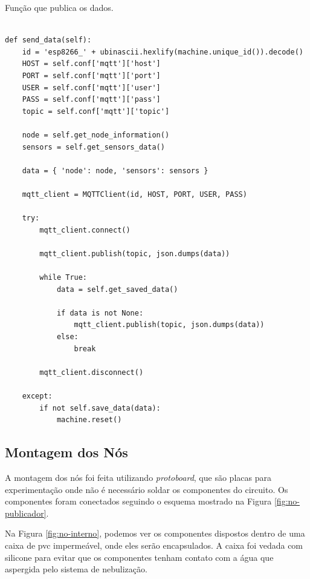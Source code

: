 \begin{quadro}[H]
\centering
\caption{Função que publica os dados.}
\vspace{-\baselineskip}
\begin{verbatim}

def send_data(self):
    id = 'esp8266_' + ubinascii.hexlify(machine.unique_id()).decode()
    HOST = self.conf['mqtt']['host']
    PORT = self.conf['mqtt']['port']
    USER = self.conf['mqtt']['user']
    PASS = self.conf['mqtt']['pass']
    topic = self.conf['mqtt']['topic']

    node = self.get_node_information()
    sensors = self.get_sensors_data()

    data = { 'node': node, 'sensors': sensors }

    mqtt_client = MQTTClient(id, HOST, PORT, USER, PASS)
    
    try:
        mqtt_client.connect()

        mqtt_client.publish(topic, json.dumps(data))

        while True:
            data = self.get_saved_data()

            if data is not None:
                mqtt_client.publish(topic, json.dumps(data))
            else:
                break
        
        mqtt_client.disconnect()

    except:            
        if not self.save_data(data):
            machine.reset()

\end{verbatim}
\vspace{-1.2cm}
\label{tab:funcao-publica}
\end{quadro}

\subsection{Montagem dos Nós}
A montagem dos nós foi feita utilizando \textit{protoboard}, que são placas para experimentação onde não é necessário soldar os componentes do circuito. Os componentes foram conectados seguindo o esquema mostrado na Figura \ref{fig:no-publicador}.

Na Figura \ref{fig:no-interno}, podemos ver os componentes dispostos dentro de uma caixa de pvc impermeável, onde eles serão encapsulados. A caixa foi vedada com silicone para evitar que os componentes tenham contato com a água que aspergida pelo sistema de nebulização. 

